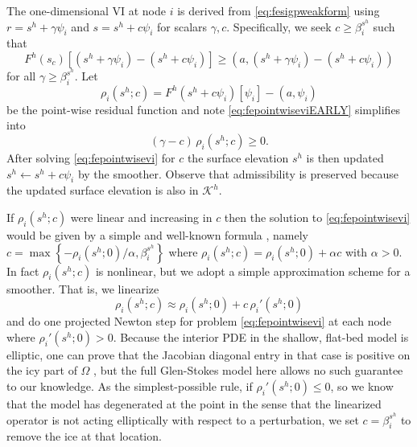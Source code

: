 \documentclass[letterpaper,final,12pt,reqno]{amsart}
\theoremstyle{claim}
\newcommand{\ip}[2]{\left(#1,#2\right)}
\numberwithin{equation}{section}
\numberwithin{figure}{section}
\numberwithin{table}{section}
\numberwithin{theorem}{section}
\begin{document}
The one-dimensional VI at node $i$ is derived from \eqref{eq:fesigpweakform} using $r = s^h+\gamma \psi_i$ and $s = s^h+c \psi_i$ for scalars $\gamma,c$.  Specifically, we seek $c \ge \beta_i^{s^h}$ such that
\begin{equation}
F^h(s_c)[(s^h+\gamma \psi_i) - (s^h+c \psi_i)] \ge \ip{a}{(s^h+\gamma \psi_i) - (s^h+c \psi_i)} \label{eq:fepointwiseviEARLY}
\end{equation}
for all $\gamma \ge \beta_i^{s^h}$.  Let
\begin{equation}
\rho_i(s^h; c) = F^h(s^h+c\psi_i)[\psi_i] - \ip{a}{\psi_i} \label{eq:ferhoi}
\end{equation}
be the point-wise residual function and note \eqref{eq:fepointwiseviEARLY} simplifies into
\begin{equation}
(\gamma - c) \,\rho_i(s^h; c) \ge 0. \label{eq:fepointwisevi}
\end{equation}
After solving \eqref{eq:fepointwisevi} for $c$ the surface elevation $s^h$ is then updated $s^h \gets s^h + c \psi_i$ by the smoother.  Observe that admissibility is preserved because the updated surface elevation is also in $\mathcal{K}^h$.

If $\rho_i(s^h; c)$ were linear and increasing in $c$ then the solution to \eqref{eq:fepointwisevi} would be given by a simple and well-known formula \cite[formula (4.4), for example]{GraeserKornhuber2009}, namely $c = \max\left\{-\rho_i(s^h; 0)/\alpha, \beta_i^{s^h}\right\}$ where $\rho_i(s^h; c) = \rho_i(s^h; 0) + \alpha c$ with $\alpha > 0$.  In fact $\rho_i(s^h; c)$ is nonlinear, but we adopt a simple approximation scheme for a smoother.  That is, we linearize
\begin{equation}
\rho_i(s^h; c) \approx \rho_i(s^h; 0) + c\, \rho_i'(s^h; 0) \label{eq:rhoapprox}
\end{equation}
and do one projected Newton step for problem \eqref{eq:fepointwisevi} at each node where $\rho_i'(s^h; 0) > 0$.  Because the interior PDE in the shallow, flat-bed model is elliptic, one can prove that the Jacobian diagonal entry in that case is positive on the icy part of $\Omega$ \cite{JouvetBueler2012}, but the full Glen-Stokes model here allows no such guarantee to our knowledge.  As the simplest-possible rule, if $\rho_i'(s^h; 0) \le 0$, so we know that the model has degenerated at the point in the sense that the linearized operator is not acting elliptically with respect to a perturbation, we set $c = \beta_i^{s^h}$ to remove the ice at that location.  %
\end{document}
